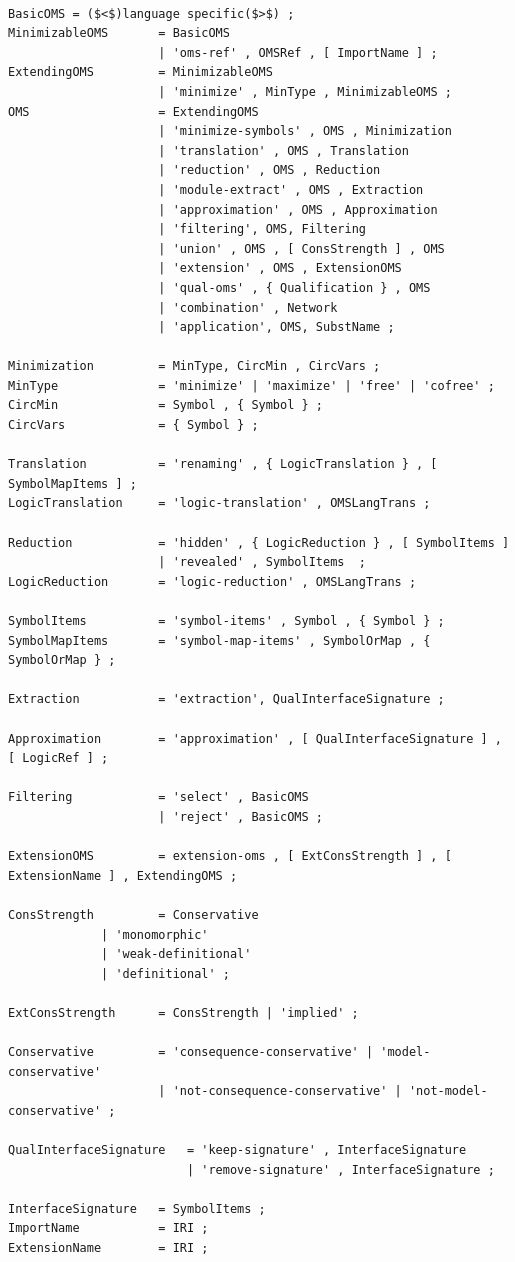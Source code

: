 \documentclass[10pt,fleqn,%
\ifpretendfinal
final%
\else
draft%
\fi,
]{scrreprt}
\begin{document}
\begin{lstlisting}[language=ebnf,escapeinside={()}]  % abstract syntax

BasicOMS = ($<$)language specific($>$) ;
MinimizableOMS       = BasicOMS
                     | 'oms-ref' , OMSRef , [ ImportName ] ;
ExtendingOMS         = MinimizableOMS
                     | 'minimize' , MinType , MinimizableOMS ;
OMS                  = ExtendingOMS
                     | 'minimize-symbols' , OMS , Minimization
                     | 'translation' , OMS , Translation
                     | 'reduction' , OMS , Reduction
                     | 'module-extract' , OMS , Extraction 
                     | 'approximation' , OMS , Approximation
                     | 'filtering', OMS, Filtering
                     | 'union' , OMS , [ ConsStrength ] , OMS 
                     | 'extension' , OMS , ExtensionOMS 
                     | 'qual-oms' , { Qualification } , OMS
                     | 'combination' , Network
                     | 'application', OMS, SubstName ;

Minimization         = MinType, CircMin , CircVars ;
MinType              = 'minimize' | 'maximize' | 'free' | 'cofree' ;
CircMin              = Symbol , { Symbol } ;
CircVars             = { Symbol } ;

Translation          = 'renaming' , { LogicTranslation } , [ SymbolMapItems ] ;
LogicTranslation     = 'logic-translation' , OMSLangTrans ;

Reduction            = 'hidden' , { LogicReduction } , [ SymbolItems ]
                     | 'revealed' , SymbolItems  ;
LogicReduction       = 'logic-reduction' , OMSLangTrans ;

SymbolItems          = 'symbol-items' , Symbol , { Symbol } ;
SymbolMapItems       = 'symbol-map-items' , SymbolOrMap , { SymbolOrMap } ;

Extraction           = 'extraction', QualInterfaceSignature ;

Approximation        = 'approximation' , [ QualInterfaceSignature ] , [ LogicRef ] ;

Filtering            = 'select' , BasicOMS 
                     | 'reject' , BasicOMS ;

ExtensionOMS         = extension-oms , [ ExtConsStrength ] , [ ExtensionName ] , ExtendingOMS ;

ConsStrength         = Conservative 
		     | 'monomorphic'  
		     | 'weak-definitional' 
		     | 'definitional' ;

ExtConsStrength      = ConsStrength | 'implied' ;

Conservative         = 'consequence-conservative' | 'model-conservative' 
                     | 'not-consequence-conservative' | 'not-model-conservative' ;

QualInterfaceSignature   = 'keep-signature' , InterfaceSignature 
                         | 'remove-signature' , InterfaceSignature ;

InterfaceSignature   = SymbolItems ;
ImportName           = IRI ;
ExtensionName        = IRI ;
\end{lstlisting}
\end{document}
